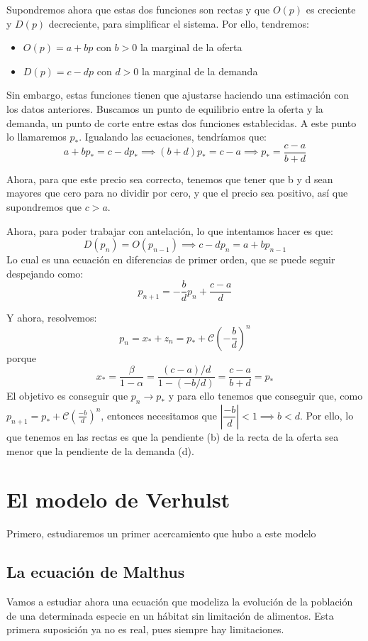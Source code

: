 \documentclass[11pt, a4paper, titlepage]{article}
\theoremstyle{theorem-style}
\theoremstyle{definition-style}
\theoremstyle{remark-style}
\theoremstyle{example-style}
\begin{document}
Supondremos ahora que estas dos funciones son rectas y que $O(p)$ es creciente y $D(p)$ decreciente, para simplificar el sistema. Por ello, tendremos:
\begin{itemize}
\item $O(p) = a+bp $ con $b>0$ la marginal de la oferta
\item $D(p) = c -dp $ con $d> 0$ la marginal de la demanda
	
\end{itemize}
Sin embargo, estas funciones tienen que ajustarse haciendo una estimación con los datos anteriores. Buscamos un punto de equilibrio entre la oferta y la demanda, un punto de corte entre estas dos funciones establecidas. A este punto lo llamaremos $p_*$. Igualando las ecuaciones, tendríamos que:
\[
 a+bp_*=c-dp_*\implies(b+d)p_*= c-a \implies p_* = \frac{c-a}{b+d}
\]

Ahora, para que este precio sea correcto, tenemos que tener que b y d sean mayores que cero para no dividir por cero, y que el precio sea positivo, así que supondremos que $c> a$.

Ahora, para poder trabajar con antelación, lo que intentamos hacer es que:
\[
D(p_n) = O(p_{n-1}) \implies c-dp_n = a+bp_{n-1}
\]
Lo cual es una ecuación en diferencias de primer orden, que se puede seguir despejando como:
\[
p_{n+1} = -\dfrac{b}{d}p_n+ \dfrac{c-a}{d}
\]

Y ahora, resolvemos:
\[
p_n = x_* + z_n = p_* + \mathcal{C}\left(-\frac{b}{d}\right)^n
\] porque 
\[
x_* = \frac{\beta}{1-\alpha} = \frac{(c-a)/d}{1-(-b/d)}= \frac{c-a}{b+d} = p_*
\]
El objetivo es conseguir que $p_n \to p_*$ y para ello tenemos que conseguir que, como $p_{n+1} =p_* + \mathcal{C}(\frac{-b}{d})^n$, entonces necesitamos que $\left|\dfrac{-b}{d}\right| < 1 \implies b < d$.
Por ello, lo que tenemos en las rectas es que la pendiente (b) de la recta de la oferta sea menor que la pendiente de la demanda (d).

\section{El modelo de Verhulst}

Primero, estudiaremos un primer acercamiento que hubo a este modelo

\subsection{La ecuación de Malthus}
Vamos a estudiar ahora una ecuación que modeliza la evolución de la población de una determinada especie en un hábitat sin limitación de alimentos. Esta primera suposición ya no es real, pues siempre hay limitaciones.
\end{document}
